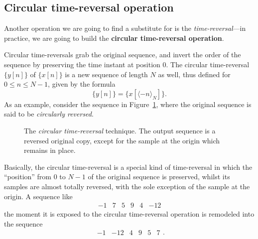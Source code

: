 \documentclass[\documentfontsize, twocolumn]{\classname}
\begin{document}
\subsection{Circular time-reversal operation}
Another operation we are going to find a substitute for is the \emph{time-reversal}---in practice, we are going to build the \textbf{circular time-reversal operation}.

Circular time-reversals grab the original sequence, and invert the order of the sequence by preserving the time instant at position $0$. The circular time-reversal $\{y[n]\}$ of $\{x[n]\}$ is a new sequence of length $N$ as well, thus defined for $0 \leq n \leq N-1$, given by the formula
\begin{equation}\label{eqn:circularTimeReversal}
    \{y[n]\} = \{x[\langle -n \rangle_N]\}.
\end{equation}
As an example, consider the sequence in Figure~\ref{tikz:circularTimeReversal}, where the original sequence is said to be \emph{circularly reversed}.
\begin{figure}[ht]
\begin{center}
    \end{center}\caption{The \emph{circular time-reversal} technique. The output sequence is a reversed original copy, except for the sample at the origin which remains in place.}\label{tikz:circularTimeReversal}
\end{figure}

Basically, the circular time-reversal is a special kind of time-reversal in which the ``position'' from $0$ to $N-1$ of the original sequence is preserved, whilst its samples are almost totally reversed, with the sole exception of the sample at the origin. A sequence like
\[
    \begin{matrix} -1 & 7 & 5 & 9 & 4 & -12\end{matrix}
\]
the moment it is exposed to the circular time-reversal operation is remodeled into the sequence
\[
    \begin{matrix} -1 & -12 & 4 & 9 & 5 & 7\end{matrix}.
\]
\end{document}
